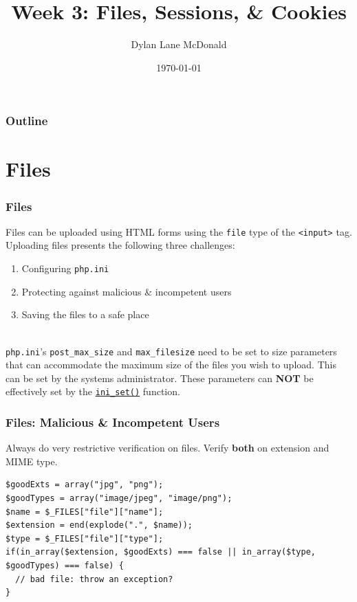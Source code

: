 \documentclass[aspectratio=169]{beamer}
\title{Week 3: Files, Sessions, \& Cookies}
\author{Dylan Lane McDonald}
\institute{CNM STEMulus Center\\Web Development with PHP}
\date{\today}
\begin{document}
\lstset{language=PHP}
\begin{frame}
\titlepage
\end{frame}

\begin{frame}
\frametitle{Outline}
\tableofcontents
\end{frame}

\section{Files}
\begin{frame}
\frametitle{Files}
Files can be uploaded using HTML forms using the \texttt{file} type of the \texttt{<input>} tag. Uploading files presents the following three challenges:
\begin{enumerate}
	\item Configuring \texttt{php.ini}
	\item Protecting against malicious \& incompetent users
	\item Saving the files to a safe place
\end{enumerate}
\pause
\mbox{}\\
\texttt{php.ini}'s \texttt{post\_max\_size} and \texttt{max\_filesize} need to be set to size parameters that can accommodate the maximum size of the files you wish to upload. This can be set by the systems administrator. These parameters can \textbf{NOT} be effectively set by the \href{http://us.php.net/manual/en/function.ini-set.php}{\texttt{ini\_set()}} function.
\end{frame}

\begin{frame}[fragile]
\frametitle{Files: Malicious \& Incompetent Users}
Always do very restrictive verification on files. Verify \textbf{both} on extension and MIME type.
\begin{lstlisting}[caption=Verifying a File,label=code:file-verify]
$goodExts = array("jpg", "png");
$goodTypes = array("image/jpeg", "image/png");
$name = $_FILES["file"]["name"];
$extension = end(explode(".", $name));
$type = $_FILES["file"]["type"];
if(in_array($extension, $goodExts) === false || in_array($type, $goodTypes) === false) {
  // bad file: throw an exception?
}
\end{lstlisting}
\end{frame}
\end{document}
